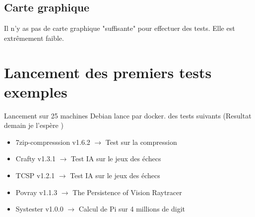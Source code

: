 \documentclass[french]{article}
\begin{document}
\subsection{Carte graphique }
Il n'y as pas de carte graphique "suffisante" pour effectuer des tests. Elle est extrêmement faible.
\newpage

\section{Lancement des premiers tests exemples}

Lancement sur 25 machines Debian lance par docker. des tests suivants (Resultat demain je l’espère )
\begin{itemize}
\item  7zip-compresssion  	v1.6.2 $\rightarrow$ Test sur la compression
\item  Crafty				v1.3.1 $\rightarrow$ Test IA sur le jeux des échecs
\item  TCSP					v1.2.1 $\rightarrow$ Test IA sur le jeux des échecs
\item  Povray				v1.1.3 $\rightarrow$ The Persistence of Vision Raytracer 
\item  Systester			v1.0.0 $\rightarrow$ Calcul de Pi sur 4 millions de digit 
\end{itemize}
\newpage
\begin{thebibliography}{9}


\end{thebibliography}
\end{document}
